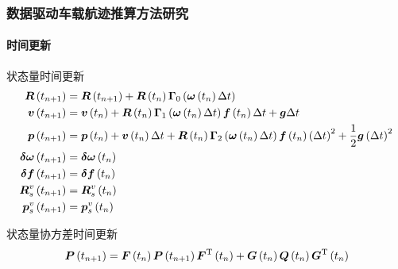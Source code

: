 \begin{frame}
	\frametitle{数据驱动车载航迹推算方法研究}	
	\framesubtitle{时间更新}
	\vspace{-0.2cm}
	{\small
		状态量时间更新
		\begin{align*}
			\vb*{R}\left(t_{n+1}\right) &= \vb*{R}\left(t_{n+1}\right) + \vb*{R}\left(t_{n}\right) \vb*{\Gamma}_{0}\left( \vb*{\omega}\left(t_{n}\right) \Delta t \right) \\
			\vb*{v}\left(t_{n+1}\right) &= \vb*{v}\left(t_{n}\right) 
			+ \vb*{R}\left(t_{n}\right) \vb*{\Gamma}_{1}\left( \vb*{\omega}\left(t_{n}\right) \Delta t \right) \vb*{f}\left(t_{n}\right) \Delta t 
			+ \vb*{g}\Delta t \\
			\vb*{p}\left(t_{n+1}\right) &= \vb*{p}\left(t_{n}\right) 
			+ \vb*{v}\left(t_{n}\right) \Delta t
			+ \vb*{R}\left(t_{n}\right) \vb*{\Gamma}_{2}\left( \vb*{\omega}\left(t_{n}\right) \Delta t \right) \vb*{f}\left(t_{n}\right) \left(\Delta t\right)^2 
			+ \frac{1}{2}\vb*{g}\left(\Delta t\right)^2 \\
			\vb*{\delta \omega}\left(t_{n+1}\right) &= \vb*{\delta \omega}\left(t_{n}\right) \\
			\vb*{\delta f}\left(t_{n+1}\right) &= \vb*{\delta f}\left(t_{n}\right) \\
			\vb*{R}_s^v\left(t_{n+1}\right) &= \vb*{R}_s^v\left(t_{n}\right) \\
			\vb*{p}_s^v\left(t_{n+1}\right) &= \vb*{p}_s^v\left(t_{n}\right) 
		\end{align*}
		
		状态量协方差时间更新
		\begin{equation*}
			\vb*{P}\left(t_{n+1}\right) = \vb*{F}\left(t_{n}\right) \vb*{P}\left(t_{n+1}\right) \vb*{F}^{\mathrm{T}}\left(t_{n}\right)
			+ \vb*{G}\left(t_{n}\right) \vb*{Q}\left(t_{n}\right) \vb*{G}^{\mathrm{T}}\left(t_{n}\right)
		\end{equation*}
	}
 
\end{frame}

